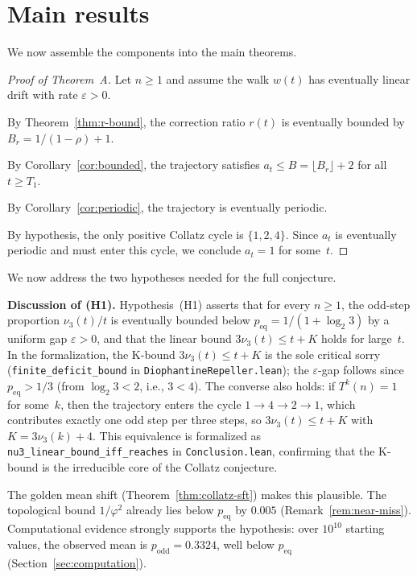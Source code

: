 \documentclass[manuscript]{aomart}
\theoremstyle{plain}
\theoremstyle{definition}
\theoremstyle{remark}
\numberwithin{equation}{section}
\begin{document}
\section{Main results}\label{sec:main}

We now assemble the components into the main theorems.

\begin{proof}[Proof of Theorem~A]
Let $n \ge 1$ and assume the walk $w(t)$ has eventually linear drift
with rate $\varepsilon > 0$.

By Theorem~\ref{thm:r-bound}, the correction ratio $r(t)$ is
eventually bounded by $B_r = 1/(1-\rho) + 1$.

By Corollary~\ref{cor:bounded}, the trajectory satisfies
$a_t \le B = \lfloor B_r \rfloor + 2$ for all $t \ge T_1$.

By Corollary~\ref{cor:periodic}, the trajectory is eventually
periodic.

By hypothesis, the only positive Collatz cycle is $\{1, 2, 4\}$.
Since $a_t$ is eventually periodic and must enter this cycle, we
conclude $a_t = 1$ for some~$t$.
\end{proof}

We now address the two hypotheses needed for the full conjecture.

\medskip\noindent
\textbf{Discussion of (H1).}
Hypothesis~(H1) asserts that for every $n \ge 1$, the odd-step
proportion $\nu_3(t)/t$ is eventually bounded below
$p_{\mathrm{eq}} = 1/(1+\log_2 3)$ by a uniform gap
$\varepsilon > 0$, and that the linear bound $3\nu_3(t) \le t + K$
holds for large~$t$.  In the formalization, the K-bound
$3\nu_3(t) \le t + K$ is the sole critical sorry
(\texttt{finite\_deficit\_bound} in \texttt{DiophantineRepeller.lean});
the $\varepsilon$-gap follows since $p_{\mathrm{eq}} > 1/3$
(from $\log_2 3 < 2$, i.e., $3 < 4$).
The converse also holds: if $T^k(n) = 1$ for some~$k$, then
the trajectory enters the cycle $1 \to 4 \to 2 \to 1$, which
contributes exactly one odd step per three steps, so
$3\nu_3(t) \le t + K$ with $K = 3\nu_3(k) + 4$.  This equivalence
is formalized as \texttt{nu3\_linear\_bound\_iff\_reaches} in
\texttt{Conclusion.lean}, confirming that the K-bound is the
irreducible core of the Collatz conjecture.

The golden mean shift (Theorem~\ref{thm:collatz-sft}) makes this
plausible.  The topological bound $1/\varphi^2$ already lies below
$p_{\mathrm{eq}}$ by $0.005$ (Remark~\ref{rem:near-miss}).
Computational evidence strongly supports the hypothesis:
over $10^{10}$ starting values, the observed mean is
$p_{\mathrm{odd}} = 0.3324$, well below $p_{\mathrm{eq}}$
(Section~\ref{sec:computation}).
\end{document}
